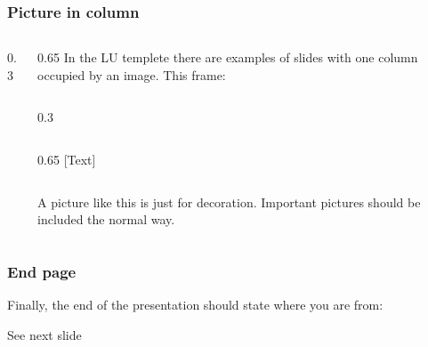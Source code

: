 \documentclass[aspectratio=1610]{beamer}
\begin{document}
\begin{frame}[fragile]
  \frametitle{Picture in column}
  \begin{columns}[onlytextwidth]
    \begin{column}{0.3\linewidth}
    \end{column}%
    \begin{column}{0.65\linewidth}
      In the LU templete there are examples of slides with one column occupied by an image. This frame:
\begin{CodeBox}{}
\begin{columns}[onlytextwidth]
  \begin{column}{0.3\textwidth}
  \end{column}
\end{columns}%
\begin{column}{0.65\textwidth}
  [Text]
\end{column}
\end{CodeBox}      
      A picture like this is just for decoration. Important pictures should be included the normal way.
    \end{column}
  \end{columns}
\end{frame}

\begin{frame}
  \frametitle{End page}
  Finally, the end of the presentation should state where you are from:
\begin{CodeBox}{}
\begin{frame}[plain]
  \endpage
\end{frame}%
\end{CodeBox}
  See next slide
\end{frame}

\begin{frame}[plain]
  \endpage
\end{frame}

\end{document}
